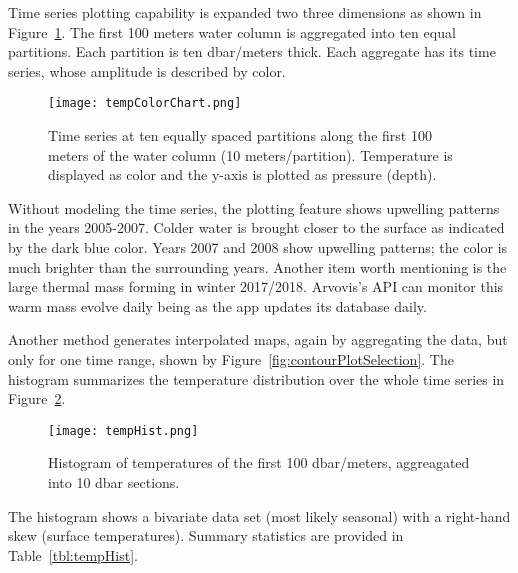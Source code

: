 Time series plotting capability is expanded two three dimensions as shown in Figure~\ref{fig:vts}. The first 100 meters water column is aggregated into ten equal partitions. Each partition is ten dbar/meters thick. Each aggregate has its time series, whose amplitude is described by color. 

\begin{figure}[H]
\centering
\begin{minipage}{4in}
\texttt{[image: tempColorChart.png]}
\caption{\label{fig:vts}Time series at ten equally spaced partitions along the first 100 meters of the water column (10 meters/partition). Temperature is displayed as color and the y-axis is plotted as pressure (depth).}
\end{minipage}
\end{figure}

Without modeling the time series, the plotting feature shows upwelling patterns in the years 2005-2007. Colder water is brought closer to the surface as indicated by the dark blue color. Years 2007 and 2008 show upwelling patterns; the color is much brighter than the surrounding years. Another item worth mentioning is the large thermal mass forming in winter 2017/2018. Arvovis's API can monitor this warm mass evolve daily being as the app updates its database daily.

Another method generates interpolated maps, again by aggregating the data, but only for one time range, shown by Figure~\ref{fig:contourPlotSelection}.
The histogram summarizes the temperature distribution over the whole time series in Figure~\ref{fig:tempHist}.

\begin{figure}[H]
\centering
\begin{minipage}{4in}
\texttt{[image: tempHist.png]}
\caption{\label{fig:tempHist}Histogram of temperatures of the first 100 dbar/meters, aggreagated into 10 dbar sections.}
\end{minipage}
\end{figure}

The histogram shows a bivariate data set (most likely seasonal) with a right-hand skew (surface temperatures). Summary statistics are provided in Table~\ref{tbl:tempHist}.

